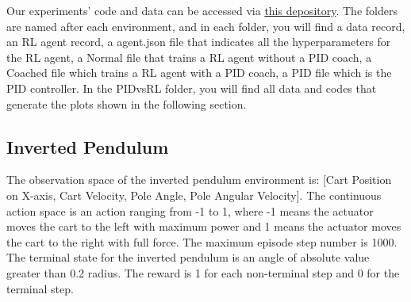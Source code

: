 Our experiments' code and data can be accessed via \href{https://github.com/BaiLiping/Coaching}{this depository}. The folders are named after each environment, and in each folder, you will find a data record, an RL agent record, a agent.json file that indicates all the hyperparameters for the RL agent, a Normal file that trains a RL agent without a PID coach, a Coached file which trains a RL agent with a PID coach, a PID file which is the PID controller. In the PIDvsRL folder, you will find all data and codes that generate the plots shown in the following section.

\subsection{Inverted Pendulum}
The observation space of the inverted pendulum environment is: [Cart Position on X-axis, Cart Velocity, Pole Angle, Pole Angular Velocity]. The continuous action space is an action ranging from -1 to 1, where -1 means the actuator moves the cart to the left with maximum power and 1 means the actuator moves the cart to the right with full force. The maximum episode step number is 1000. The terminal state for the inverted pendulum is an angle of absolute value greater than 0.2 radius. The reward is 1 for each non-terminal step and 0 for the terminal step. 
